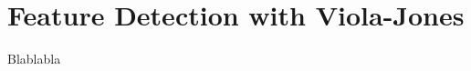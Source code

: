 \chapter{Feature Detection with Viola-Jones}
\label{chap:implementation_violajones}



\noindent Blablabla
\newline